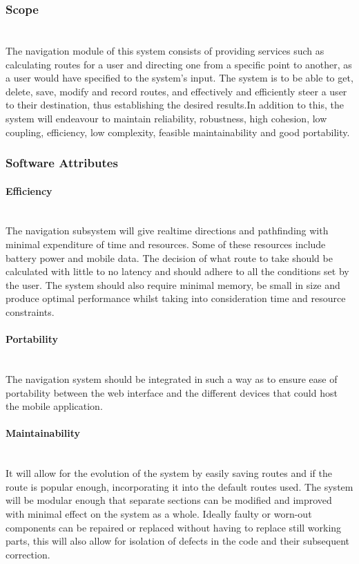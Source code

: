 \subsubsection{Scope}
\paragraph{}
\mbox{}\\
The navigation module of this system consists of providing services such as
calculating routes for a user and directing one from a specific point to another,
as a user would have specified to the system’s input. The system is to be able
to get, delete, save, modify and record routes, and effectively and efficiently steer
a user to their destination, thus establishing the desired results.In addition to this,
the system will endeavour to maintain reliability, robustness, high cohesion,
low coupling, efficiency, low complexity, feasible maintainability and good portability.


\subsubsection{Software Attributes}

	\paragraph{Efficiency}
	\mbox{}\\
	The navigation subsystem will give realtime directions and pathfinding with minimal
	expenditure of time and resources. Some of these resources include battery power and mobile
	data. The decision of what route to take should be calculated with little to no latency and
	should adhere to all the conditions set by the user. The system should also require minimal
	memory, be small in size and produce optimal performance whilst taking into consideration
	time and resource constraints.

	\paragraph{Portability}
	\mbox{}\\
	The navigation system should be integrated in such a way as to ensure ease of portability
	 between the web interface and the different devices that could host the mobile application.

	\paragraph{Maintainability}
	\mbox{}\\
	It will allow for the evolution of the system by easily saving routes and if the route is
	popular enough, incorporating it into the default routes used. The system will be modular
	 enough that separate sections can be modified and improved with minimal effect on the
	 system as a whole. Ideally faulty or worn-out components can be repaired or replaced
	  without having to replace still working parts, this will also allow for isolation of
	  defects in the code and their subsequent correction.

